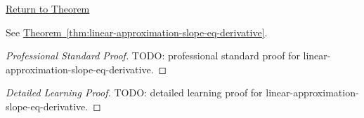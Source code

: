\newpage
{}
\label{prf:linear-approximation-slope-eq-derivative}

\begin{remark*}[Return]
\hyperref[thm:linear-approximation-slope-eq-derivative]{Return to Theorem}
\end{remark*}

\begin{theorem*}
See \hyperref[thm:linear-approximation-slope-eq-derivative]{Theorem~\ref*{thm:linear-approximation-slope-eq-derivative}}.
\end{theorem*}

\begin{proof}[Professional Standard Proof]
\LRAProofBodyStart
TODO: professional standard proof for linear-approximation-slope-eq-derivative.
\end{proof}

\begin{proof}[Detailed Learning Proof]
\LRAProofBodyStart
TODO: detailed learning proof for linear-approximation-slope-eq-derivative.
\end{proof}

\begin{remark*}
\end{remark*}

\begin{dependencies}
\NoLocalDependencies
\end{dependencies}

\clearpage
